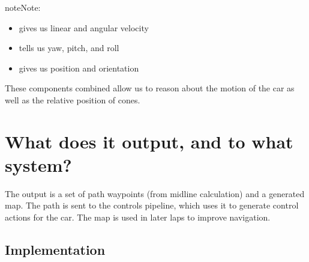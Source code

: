 \documentclass[letterpaper,10pt,english]{sphinxmanual}
\begin{document}
\begin{sphinxadmonition}{note}{Note:}\begin{itemize}
\item {} 
\sphinxAtStartPar
{\hyperref[\detokenize{glossary:term-Twist}]{}} gives us linear and angular velocity

\item {} 
\sphinxAtStartPar
{\hyperref[\detokenize{glossary:term-Quaternion}]{}} tells us yaw, pitch, and roll

\item {} 
\sphinxAtStartPar
{\hyperref[\detokenize{glossary:term-Pose}]{}} gives us position and orientation

\end{itemize}

\sphinxAtStartPar
These components combined allow us to reason about the motion of the car as well as the relative position of cones.
\end{sphinxadmonition}


\chapter{What does it output, and to what system?}
\label{\detokenize{index:what-does-it-output-and-to-what-system}}
\sphinxAtStartPar
The output is a set of path waypoints (from midline calculation) and a {\hyperref[\detokenize{glossary:term-SLAM}]{}}\sphinxhyphen{}generated map. The path is sent to the controls pipeline, which uses it to generate control actions for the car. The map is used in later laps to improve navigation.

\sphinxstepscope


\section{Implementation}
\label{\detokenize{implementation:implementation}}\label{\detokenize{implementation::doc}}
\end{document}
